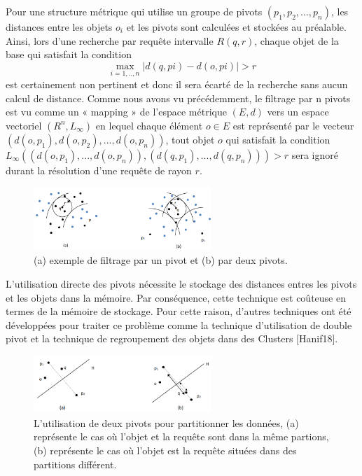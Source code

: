 Pour une structure métrique qui utilise un groupe de pivots $ (p_1,p_2,…, p_n) $, les distances entre les objets $ o_i $ et les pivots sont calculées et stockées au préalable. Ainsi, lors d’une recherche par requête intervalle $ R(q,r) $, chaque objet de la base qui satisfait la condition  \begin{displaymath}
	\max_{i=1,..,n}{|d(q,pi)-d(o,pi)|} > r
\end{displaymath}  est certainement non pertinent et donc il sera écarté de la recherche sans aucun calcul de distance. Comme nous avons vu précédemment, le filtrage par n pivots est vu comme un « mapping » de l’espace métrique $ (E,d) $ vers un espace vectoriel $ (R^n, L_\infty) $ en lequel chaque élément $ o \in E $ est représenté par le vecteur $ (d(o,p_1), d(o,p_2),..., d(o,p_n)) $, tout objet $ o $ qui satisfait la condition $ L_\infty((d(o,p_1),..., d(o,p_n)),(d(q,p_1),..., d(q,p_n))) > r  $ sera ignoré durant la résolution d’une requête de rayon $ r $.

\begin{figure}[H]
	\centering
	\includegraphics[width=0.6\textwidth]{Figures/npivot.png} %
	\caption{(a) exemple de filtrage par un pivot et (b) par deux pivots.}
\end{figure}

L’utilisation directe des pivots nécessite le stockage des distances entres les pivots et les objets dans la mémoire. Par conséquence, cette technique est coûteuse en termes de la mémoire de stockage. Pour cette raison, d'autres techniques ont été développées pour traiter ce problème comme la technique d’utilisation de double pivot et la technique de regroupement des objets dans des Clusters [Hanif18].


\begin{figure}[H]
	\centering
	\includegraphics[width=0.6\textwidth]{Figures/2pivot.png} %
	\caption{L'utilisation de deux pivots pour partitionner les données, (a) représente le cas où l'objet et la requête sont dans la même partions, (b) représente le cas où l’objet est la requête situées dans des partitions différent.}
\end{figure}

